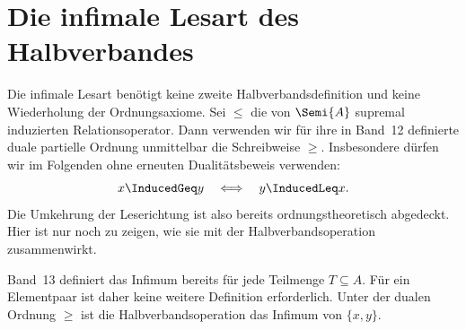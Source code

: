 \documentclass[main.tex]{subfiles}
\begin{document}
\section{Die infimale Lesart des Halbverbandes}

Die infimale Lesart benötigt keine zweite Halbverbandsdefinition und keine
Wiederholung der Ordnungsaxiome. Sei \(\leq\) die von
\(\Semi{A}\) supremal induzierten Relationsoperator. Dann verwenden wir
für ihre in Band~12 definierte duale partielle Ordnung unmittelbar die
Schreibweise \(\geq\). Insbesondere dürfen wir im Folgenden ohne erneuten
Dualitätsbeweis verwenden:
\[
  x\InducedGeq y\quad\Longleftrightarrow\quad y\InducedLeq x.
\]
Die Umkehrung der Leserichtung ist also bereits ordnungstheoretisch
abgedeckt. Hier ist nur noch zu zeigen, wie sie mit der
Halbverbandsoperation zusammenwirkt.

\begin{tabproofwide}
\end{tabproofwide}

Band~13 definiert das Infimum bereits für jede Teilmenge \(T\subseteq A\).
Für ein Elementpaar ist daher keine weitere Definition erforderlich. Unter
der dualen Ordnung \(\geq\) ist die Halbverbandsoperation das Infimum von
\(\{x,y\}\).

\begin{tabproof}
\end{tabproof}
\end{document}
